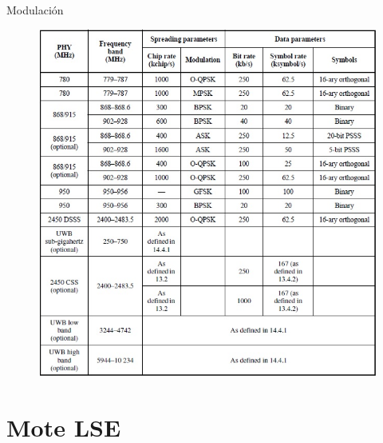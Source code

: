 \documentclass[aspectratio=169]{beamer}
\begin{document}
\begin{frame}{Modulación}
\begin{minipage}[c]{1.0\linewidth}
\begin{figure}[H]
	\includegraphics[height=1\textheight]{./imagenes/modulaciones.jpg}
		\end{figure}	
\end{minipage}
\end{frame}

\section{Mote LSE}

\end{document}
